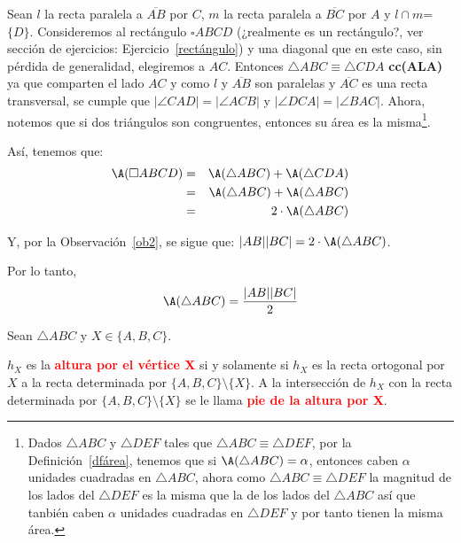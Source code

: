 \begin{pba}
Sean $l$ la recta paralela a $\overline{AB}$ por $C$, $m$ la recta paralela a $\overline{BC}$ por $A$ y $l \cap m$=$\{D\}$. Consideremos al rectángulo $\square ABCD$ (¿realmente es un rectángulo?, ver sección de ejercicios: Ejercicio~\ref{rectángulo}) y una diagonal que en este caso, sin pérdida de generalidad, elegiremos a $AC$. Entonces $\triangle ABC \equiv \triangle CDA$ \textbf{cc(ALA)} ya que comparten el lado $AC$ y como $l$ y $\overline{AB}$ son paralelas y $\overline{AC}$ es una recta transversal, se cumple que $|\angle CAD|=|\angle ACB|$ y $|\angle DCA|=|\angle BAC|$.
Ahora, notemos que si dos triángulos son congruentes, entonces su área es la misma\footnote{Dados $\triangle ABC$ y $\triangle DEF$ tales que $\triangle ABC \equiv \triangle DEF$, por la Definición~\ref{dfárea}, tenemos que si $\A(\triangle ABC)=\alpha$, entonces caben $\alpha$ unidades cuadradas en $\triangle ABC$, ahora como $\triangle ABC \equiv \triangle DEF$ la magnitud de los lados del $\triangle DEF$ es la misma que la de los lados del $\triangle ABC$ así que tanbién caben $\alpha$ unidades cuadradas en $\triangle DEF$ y por tanto tienen la misma área.}.

Así, tenemos que:
\begin{eqnarray*}
\A (\square ABCD) &=& \A (\triangle ABC)+\A(\triangle CDA)\\
&=&\A (\triangle ABC)+\A(\triangle ABC)\\
&=&2\cdot \A(\triangle ABC)
\end{eqnarray*}

Y, por la Observación~\ref{ob2}, se sigue que: $|AB||BC|= 2 \cdot \A (\triangle ABC)$.

Por lo tanto,
$$\A(\triangle ABC)=\frac{|AB||BC|}{2}$$
\end{pba}

\begin{df}\label{ADUT}
Sean $\triangle ABC$ y $X \in \{A, B, C\}$.

$h_{X}$ es la \textcolor{red}{{\bf altura por el vértice X}} si y solamente si $h_{X}$ es la recta ortogonal por $X$ a la recta determinada por $\{A, B, C\} \setminus \{X\}$. A la intersección de $h_{X}$ con la recta determinada por $\{A, B, C\} \setminus \{X\}$ se le llama \textcolor{red}{\bf pie de la altura por X}.
\end{df}

